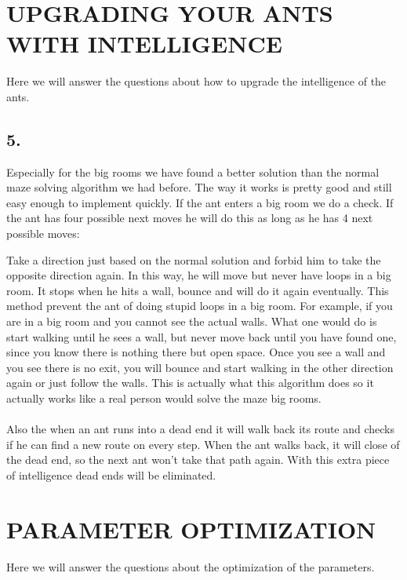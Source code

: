 \documentclass{scrartcl}
\begin{document}
\pagebreak
\section{UPGRADING YOUR ANTS WITH INTELLIGENCE}
Here we will answer the questions about how to upgrade the intelligence of the ants.

\subsection*{5.}
Especially for the big rooms we have found a better solution than the normal maze solving algorithm we had before. The way it works is pretty good and still easy enough to implement quickly. If the ant enters a big room we do a check. If the ant has four possible next moves he will do this as long as he has 4 next possible moves:\par
Take a direction just based on the normal solution and forbid him to take the opposite direction again.
In this way, he will move but never have loops in a big room. It stops when he hits a wall, bounce and will do it again eventually. This method prevent the ant of doing stupid loops in a big room. For example, if you are in a big room and you cannot see the actual walls. What one would do is start walking until he sees a wall, but never move back until you have found one, since you know there is nothing there but open space. Once you see a wall and you see there is no exit, you will bounce and start walking in the other direction again or just follow the walls. This is actually what this algorithm does so it actually works like a real person would solve the maze big rooms.\\\\

Also the when an ant runs into a dead end it will walk back its route and checks if he can find a new route on every step. When the ant walks back, it will close of the dead end, so the next ant won't take that path again. With this extra piece of intelligence dead ends will be eliminated. 
\pagebreak

\section*{PARAMETER OPTIMIZATION}
Here we will answer the questions about the optimization of the parameters.
\end{document}
